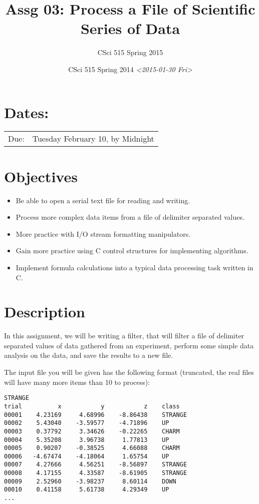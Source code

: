 \documentclass[11pt]{article}
\author{CSci 515 Spring 2015}
\date{CSci 515 Spring 2014 \textit{<2015-01-30 Fri>}}
\title{Assg 03: Process a File of Scientific Series of Data}
\begin{document}
\maketitle

\section*{Dates:}
\label{sec-1}
\begin{center}
\begin{tabular}{ll}
Due: & Tuesday February 10, by Midnight\\
\end{tabular}
\end{center}
\section*{Objectives}
\label{sec-2}
\begin{itemize}
\item Be able to open a serial text file for reading and writing.
\item Process more complex data items from a file of delimiter separated values.
\item More practice with I/O stream formatting manipulators.
\item Gain more practice using C control structures for implementing
algorithms.
\item Implement formula calculations into a typical data processing task
written in C.
\end{itemize}
\section*{Description}
\label{sec-3}
In this assignment, we will be writing a filter, that will filter a file of
delimiter separated values of data gathered from an experiment, perform
some simple data analysis on the data, and save the results to a new file.

The input file you will be given has the following format (truncated,
the real files will have many more items than 10 to process):

\begin{verbatim}
STRANGE
trial	       x	       y	       z	class
00001	 4.23169	 4.68996	-8.86438	STRANGE
00002	 5.43040	-3.59577	-4.71896	UP
00003	 0.37792	 3.34626	-0.22265	CHARM
00004	 5.35208	 3.96738	 1.77813	UP
00005	 0.90207	-0.38525	 4.66088	CHARM
00006	-4.67474	-4.18064	 1.65754	UP
00007	 4.27666	 4.56251	-8.56897	STRANGE
00008	 4.17155	 4.33587	-8.61905	STRANGE
00009	 2.52960	-3.98237	 8.60114	DOWN
00010	 0.41158	 5.61738	 4.29349	UP
...
\end{verbatim}
\end{document}

